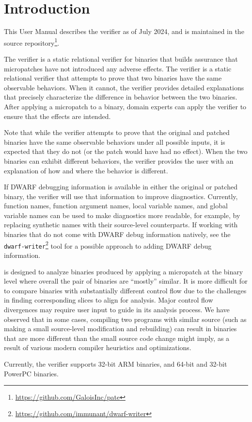 \section{Introduction}\label{sec:introduction}

This User Manual describes the \pate{} verifier as of July 2024, and is maintained in the \pate{} source repository\footnote{\url{https://github.com/GaloisInc/pate}}.

The \pate{} verifier is a static relational verifier for binaries that builds assurance that micropatches have not introduced any adverse effects.
The verifier is a static relational verifier that attempts to prove that two binaries have the same observable behaviors.
When it cannot, the verifier provides detailed explanations that precisely characterize the difference in behavior between the two binaries.
After applying a micropatch to a binary, domain experts can apply the verifier to ensure that the effects are intended.

Note that while the verifier attempts to prove that the original and patched binaries have the same observable behaviors under all possible inputs, it is expected that they do not (or the patch would have had no effect).
When the two binaries can exhibit different behaviors, the verifier provides the user with an explanation of how and where the behavior is different.

If DWARF debugging information is available in either the original or patched binary, the verifier will use that information to improve diagnostics.
Currently, function names, function argument names, local variable names, and global variable names can be used to make diagnostics more readable, for example, by replacing synthetic names with their source-level counterparts.
If working with binaries that do not come with DWARF debug information natively, see the \lstinline{dwarf-writer}\footnote{\url{https://github.com/immunant/dwarf-writer}} tool for a possible approach to adding DWARF debug information.

\pate{} is designed to analyze binaries produced by applying a micropatch at the binary level where overall the pair of binaries are ``mostly'' similar.
It is more difficult for \pate{} to compare binaries with substantially different control flow due to the challenges in finding corresponding slices to align for analysis.
Major control flow divergences may require user input to guide \pate{} in its analysis process.
We have observed that in some cases, compiling two programs with similar source (such as making a small source-level modification and rebuilding) can result in binaries that are more different than the small source code change might imply, as a result of various modern compiler heuristics and optimizations.

Currently, the verifier supports 32-bit ARM binaries, and 64-bit and 32-bit PowerPC binaries.
